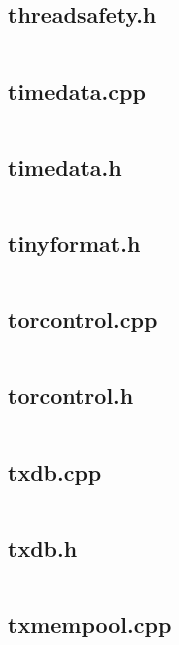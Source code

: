 \documentclass{article}
\begin{document}
\subsection{threadsafety.h}
\inputminted{cpp}{/home/dufferzafar/dev/@clones/bitcoin/src/threadsafety.h}
\newpage

\subsection{timedata.cpp}
\inputminted{cpp}{/home/dufferzafar/dev/@clones/bitcoin/src/timedata.cpp}
\newpage

\subsection{timedata.h}
\inputminted{cpp}{/home/dufferzafar/dev/@clones/bitcoin/src/timedata.h}
\newpage

\subsection{tinyformat.h}
\inputminted{cpp}{/home/dufferzafar/dev/@clones/bitcoin/src/tinyformat.h}
\newpage

\subsection{torcontrol.cpp}
\inputminted{cpp}{/home/dufferzafar/dev/@clones/bitcoin/src/torcontrol.cpp}
\newpage

\subsection{torcontrol.h}
\inputminted{cpp}{/home/dufferzafar/dev/@clones/bitcoin/src/torcontrol.h}
\newpage

\subsection{txdb.cpp}
\inputminted{cpp}{/home/dufferzafar/dev/@clones/bitcoin/src/txdb.cpp}
\newpage

\subsection{txdb.h}
\inputminted{cpp}{/home/dufferzafar/dev/@clones/bitcoin/src/txdb.h}
\newpage

\subsection{txmempool.cpp}
\inputminted{cpp}{/home/dufferzafar/dev/@clones/bitcoin/src/txmempool.cpp}
\newpage
\end{document}
